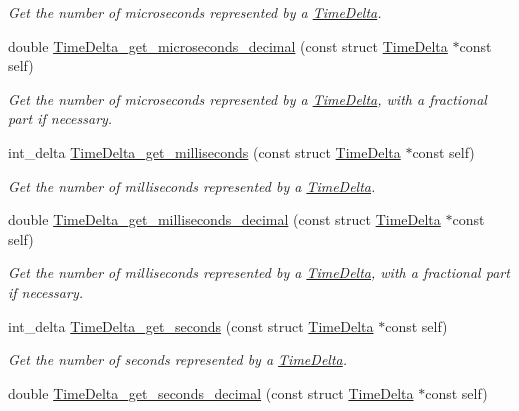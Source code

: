 \begin{DoxyCompactItemize}
\begin{DoxyCompactList}\small\item\em \-Get the number of microseconds represented by a \hyperlink{structTimeDelta}{\-Time\-Delta}. \end{DoxyCompactList}\item 
double \hyperlink{time-delta_8h_a1a423d7912a4f1cafa24a51c6aa83529}{\-Time\-Delta\-\_\-get\-\_\-microseconds\-\_\-decimal} (const struct \hyperlink{structTimeDelta}{\-Time\-Delta} $\ast$const self)
\begin{DoxyCompactList}\small\item\em \-Get the number of microseconds represented by a \hyperlink{structTimeDelta}{\-Time\-Delta}, with a fractional part if necessary. \end{DoxyCompactList}\item 
int\-\_\-delta \hyperlink{time-delta_8h_a975595bac014708aef45bf7f2b6c1eb6}{\-Time\-Delta\-\_\-get\-\_\-milliseconds} (const struct \hyperlink{structTimeDelta}{\-Time\-Delta} $\ast$const self)
\begin{DoxyCompactList}\small\item\em \-Get the number of milliseconds represented by a \hyperlink{structTimeDelta}{\-Time\-Delta}. \end{DoxyCompactList}\item 
double \hyperlink{time-delta_8h_a3f2a375289348737273a4c5054e8e290}{\-Time\-Delta\-\_\-get\-\_\-milliseconds\-\_\-decimal} (const struct \hyperlink{structTimeDelta}{\-Time\-Delta} $\ast$const self)
\begin{DoxyCompactList}\small\item\em \-Get the number of milliseconds represented by a \hyperlink{structTimeDelta}{\-Time\-Delta}, with a fractional part if necessary. \end{DoxyCompactList}\item 
int\-\_\-delta \hyperlink{time-delta_8h_a828a74fdc1d24a5086d727b1522167d3}{\-Time\-Delta\-\_\-get\-\_\-seconds} (const struct \hyperlink{structTimeDelta}{\-Time\-Delta} $\ast$const self)
\begin{DoxyCompactList}\small\item\em \-Get the number of seconds represented by a \hyperlink{structTimeDelta}{\-Time\-Delta}. \end{DoxyCompactList}\item 
double \hyperlink{time-delta_8h_ac23e1641d7d997d8c9be88a72cf6ee15}{\-Time\-Delta\-\_\-get\-\_\-seconds\-\_\-decimal} (const struct \hyperlink{structTimeDelta}{\-Time\-Delta} $\ast$const self)

\end{DoxyCompactItemize}
